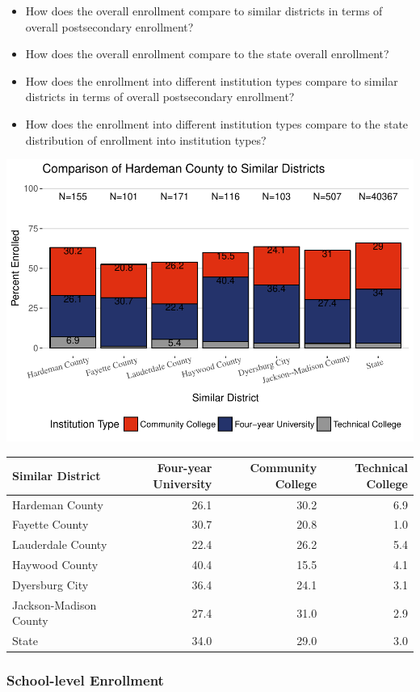 \documentclass[11pt,]{article}
\providecommand{\tightlist}{%
  \setlength{\itemsep}{0pt}\setlength{\parskip}{0pt}}
\begin{document}
\begin{itemize}
\tightlist
\item
  How does the overall enrollment compare to similar districts in terms
  of overall postsecondary enrollment?
\item
  How does the overall enrollment compare to the state overall
  enrollment?
\item
  How does the enrollment into different institution types compare to
  similar districts in terms of overall postsecondary enrollment?
\item
  How does the enrollment into different institution types compare to
  the state distribution of enrollment into institution types?
\end{itemize}

\includegraphics{20170411_PSWRR_no_CTE_files/figure-latex/comparison_districts-1.pdf}

\begin{longtable}[]{@{}lrrr@{}}
\toprule
Similar District & Four-year University & Community College & Technical
College\tabularnewline
\midrule
\endhead
Hardeman County & 26.1 & 30.2 & 6.9\tabularnewline
Fayette County & 30.7 & 20.8 & 1.0\tabularnewline
Lauderdale County & 22.4 & 26.2 & 5.4\tabularnewline
Haywood County & 40.4 & 15.5 & 4.1\tabularnewline
Dyersburg City & 36.4 & 24.1 & 3.1\tabularnewline
Jackson-Madison County & 27.4 & 31.0 & 2.9\tabularnewline
State & 34.0 & 29.0 & 3.0\tabularnewline
\bottomrule
\end{longtable}

\newpage

\subsubsection{School-level Enrollment}\label{school-level-enrollment}
\end{document}
